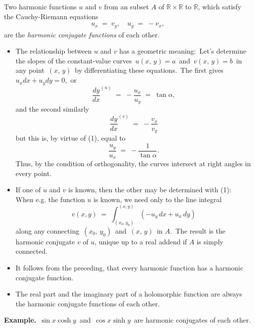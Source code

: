 \documentclass[12pt]{article}
\begin{document}
Two harmonic functions $u$ and $v$ from an  subset $A$ of $\mathbb{R}\!\times\!\mathbb{R}$ to $\mathbb{R}$, which satisfy the Cauchy-Riemann equations
\begin{align}
u_x \;=\; v_y, \quad u_y \;=\; -v_x,
\end{align}
are the {\em harmonic conjugate functions} of each other. 

\begin{itemize}

\item The relationship between $u$ and $v$ has a  geometric meaning:\, Let's determine the slopes of the constant-value curves\, $u(x,\,y) = a$\, and\, $v(x,\,y) = b$\, in any point\, $(x,\,y)$\, by differentiating these equations.\, The first gives\, $u_x dx+u_y dy = 0$,\, or
 $$\frac{dy}{dx}^{(u)} \;=\; -\frac{u_x}{u_y} \;=\; \tan\alpha,$$
and the second similarly
 $$\frac{dy}{dx}^{(v)} \;=\; -\frac{v_x}{v_y}$$
but this is, by virtue of (1), equal to
 $$\frac{u_y}{u_x} \;=\; -\frac{1}{\tan\alpha}.$$
Thus, by the condition of orthogonality, the curves intersect at right angles in every point.

\item If one of $u$ and $v$ is known, then the other may be determined with (1):\, When e.g. the function $u$ is known, we need only to  the line integral
$$v(x, y) \;=\; \int_{(x_0, y_0)}^{(x, y)}(-u_y\,dx+u_x\,dy)$$
along any  connecting \,$(x_0,\,y_0)$\, and\, 
$(x,\,y)$\, in $A$.\, The result is the harmonic conjugate $v$ of $u$, unique up to a real addend if $A$ is simply connected.

\item It follows from the preceding, that every harmonic function has a harmonic conjugate function.

\item The real part and the imaginary part of a holomorphic function are always the harmonic conjugate functions of each other.

\end{itemize}


\textbf{Example.}\, $\sin{x}\cosh{y}$\, and\, $\cos{x}\sinh{y}$\, are harmonic conjugates of each other.

\end{document}
